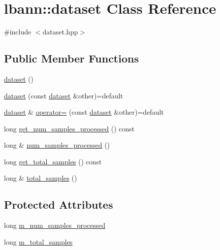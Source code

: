 \hypertarget{classlbann_1_1dataset}{}\section{lbann\+:\+:dataset Class Reference}
\label{classlbann_1_1dataset}


{\ttfamily \#include $<$dataset.\+hpp$>$}

\subsection*{Public Member Functions}
\begin{DoxyCompactItemize}
\item 
\hyperlink{classlbann_1_1dataset_ab2d74c40559624136c98b1e36193fbe3}{dataset} ()
\item 
\hyperlink{classlbann_1_1dataset_a505f3c75563db4728949ff6cdd328723}{dataset} (const \hyperlink{classlbann_1_1dataset}{dataset} \&other)=default
\item 
\hyperlink{classlbann_1_1dataset}{dataset} \& \hyperlink{classlbann_1_1dataset_a8806c93d49b1171a98f61f67de964f2b}{operator=} (const \hyperlink{classlbann_1_1dataset}{dataset} \&other)=default
\item 
long \hyperlink{classlbann_1_1dataset_a73496347a477a5ebb0dbf30140295026}{get\+\_\+num\+\_\+samples\+\_\+processed} () const
\item 
long \& \hyperlink{classlbann_1_1dataset_a412b29a50638f7d8feea4ad368c6a4dc}{num\+\_\+samples\+\_\+processed} ()
\item 
long \hyperlink{classlbann_1_1dataset_ad314847b347d413162a9d9eab759641f}{get\+\_\+total\+\_\+samples} () const
\item 
long \& \hyperlink{classlbann_1_1dataset_ab951c879f151990613567e985fe1e278}{total\+\_\+samples} ()
\end{DoxyCompactItemize}
\subsection*{Protected Attributes}
\begin{DoxyCompactItemize}
\item 
long \hyperlink{classlbann_1_1dataset_a68f4120cc4a7837e6a95b01358210cb5}{m\+\_\+num\+\_\+samples\+\_\+processed}
\item 
long \hyperlink{classlbann_1_1dataset_a2bfe72a2783e0a47e725e91dfb13d06a}{m\+\_\+total\+\_\+samples}
\end{DoxyCompactItemize}



